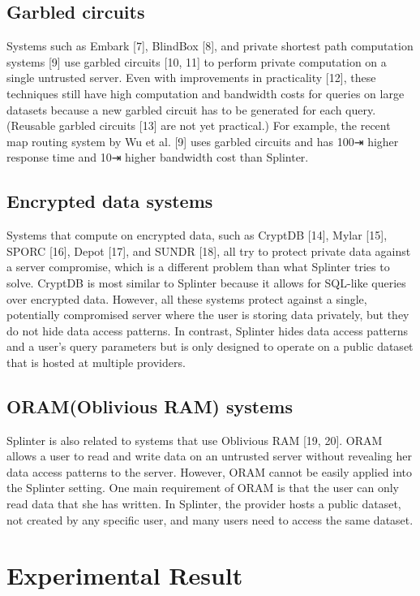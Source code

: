 \documentclass[12pt,a4paper]{article}
\begin{document}
\begin{multicols}{2}
\subsection{Garbled circuits}
Systems such as Embark [7], BlindBox [8], and 
private shortest path computation systems [9] 
use garbled circuits [10, 11] to perform private 
computation on a single untrusted server. Even with 
improvements in practicality [12], these techniques 
still have high computation and bandwidth costs for 
queries on large datasets because a new garbled 
circuit has to be generated for each query. 
(Reusable garbled circuits [13] are not yet 
practical.) For example, the recent map routing 
system by Wu et al. [9] uses garbled circuits and 
has 100⇥ higher response time and 10⇥ higher
bandwidth cost than Splinter.
\subsection{Encrypted data systems}
Systems that compute on encrypted data, such as CryptDB [14], Mylar [15], SPORC [16], Depot [17], and SUNDR [18], all try to protect private data against a server compromise, which is a different problem than what Splinter tries to solve. CryptDB is most similar to Splinter because it allows for SQL-like queries over encrypted data. However, all these systems protect against a single, potentially compromised server where the user is storing data privately, but they do not hide data access patterns. In contrast, Splinter hides data access patterns and a user’s query parameters but is only designed to operate on a public dataset that is hosted at multiple providers.
\subsection{ORAM(Oblivious RAM) systems}
Splinter is also related to systems that use Oblivious RAM [19, 20]. ORAM allows a user to read and write data on an untrusted server without revealing her data access patterns to the server. However, ORAM cannot be easily applied into the Splinter setting. One main requirement of ORAM is that the user can only read data that she has written. In Splinter, the provider hosts a public dataset, not created by any specific user, and many users need to access the same dataset.
\section{Experimental Result}

\end{multicols}
\end{document}
